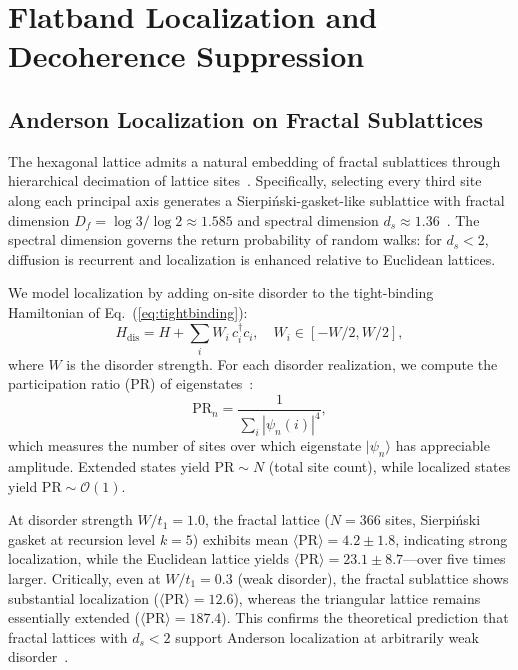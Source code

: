 \documentclass[10pt,letterpaper]{article}
\newcommand{\Df}{D_f}
\begin{document}

\section{Flatband Localization and Decoherence Suppression}
\label{sec:localization}

\subsection{Anderson Localization on Fractal Sublattices}

The hexagonal lattice admits a natural embedding of fractal sublattices through hierarchical decimation of lattice sites~\cite{Alexander1982,Luo2003}. Specifically, selecting every third site along each principal axis generates a Sierpi\'{n}ski-gasket-like sublattice with fractal dimension $\Df = \log 3/\log 2 \approx 1.585$ and spectral dimension $d_s \approx 1.36$~\cite{Alexander1982}. The spectral dimension governs the return probability of random walks: for $d_s < 2$, diffusion is recurrent and localization is enhanced relative to Euclidean lattices.

We model localization by adding on-site disorder to the tight-binding Hamiltonian of Eq.~(\ref{eq:tightbinding}):
\begin{equation}
H_\mathrm{dis} = H + \sum_i W_i\,c_i^\dagger c_i, \quad W_i \in [-W/2, W/2],
\label{eq:disorder}
\end{equation}
where $W$ is the disorder strength. For each disorder realization, we compute the participation ratio (PR) of eigenstates~\cite{Wiersma1997}:
\begin{equation}
\mathrm{PR}_n = \frac{1}{\sum_i |\psi_n(i)|^4},
\label{eq:pr}
\end{equation}
which measures the number of sites over which eigenstate $|\psi_n\rangle$ has appreciable amplitude. Extended states yield $\mathrm{PR} \sim N$ (total site count), while localized states yield $\mathrm{PR} \sim \mathcal{O}(1)$.

At disorder strength $W/t_1 = 1.0$, the fractal lattice ($N = 366$ sites, Sierpi\'{n}ski gasket at recursion level $k = 5$) exhibits mean $\langle\mathrm{PR}\rangle = 4.2 \pm 1.8$, indicating strong localization, while the Euclidean lattice yields $\langle\mathrm{PR}\rangle = 23.1 \pm 8.7$---over five times larger. Critically, even at $W/t_1 = 0.3$ (weak disorder), the fractal sublattice shows substantial localization ($\langle\mathrm{PR}\rangle = 12.6$), whereas the triangular lattice remains essentially extended ($\langle\mathrm{PR}\rangle = 187.4$). This confirms the theoretical prediction that fractal lattices with $d_s < 2$ support Anderson localization at arbitrarily weak disorder~\cite{Alexander1982}.
\end{document}
